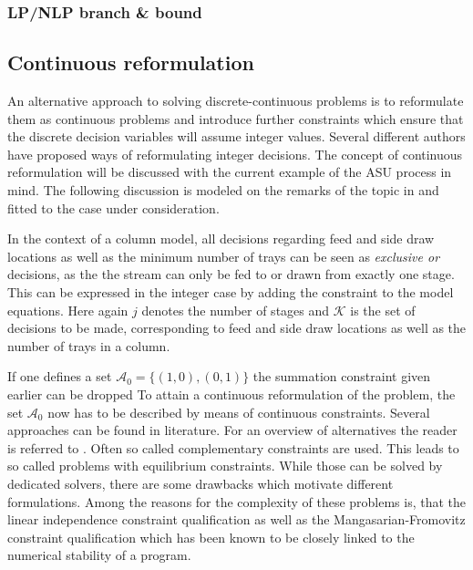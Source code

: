         \subsubsection{LP/NLP branch \& bound}



    \subsection{Continuous reformulation}
    An alternative approach to solving discrete-continuous problems is to reformulate them as continuous problems 
    and introduce further constraints which ensure that the discrete decision variables will assume integer values. 
    Several different authors have proposed ways of reformulating integer decisions. The concept of continuous reformulation 
    will be discussed with the current example of the ASU process in mind. The following discussion is modeled on the 
    remarks of the topic in \cite{Stein.2004} and fitted to the case under consideration. 
    
    In the context of a column model, all decisions regarding feed and side draw locations as well as the minimum number 
    of trays can be seen as \emph{exclusive or} decisions, as the the stream can only be fed to or drawn from exactly one 
    stage. This can be expressed in the integer case by adding the constraint  
    to the model equations. Here again $j$ denotes the number of stages and $\mathcal{K}$ is the set of decisions to be made, 
    corresponding to feed and side draw locations as well as the number of trays in a column.
    
    If one defines a set $\mathcal{A}_0 = \{(1,0), (0,1)\}$ the summation constraint given earlier can be dropped 
    To attain a continuous reformulation of the problem, the set $\mathcal{A}_0$ now has to be described by means 
    of continuous constraints. Several approaches can be found in literature. For an overview of alternatives
    the reader is referred to \cite{Stein.2004}. Often so called complementary constraints are used. This leads
    to so called problems with equilibrium constraints. While those can be solved by dedicated solvers, there are 
    some drawbacks which motivate different formulations. Among the reasons for the complexity of these problems is, 
    that the linear independence constraint qualification as well as the Mangasarian-Fromovitz constraint qualification
    which has been known to be closely linked to the numerical stability of a program. 
     
    
